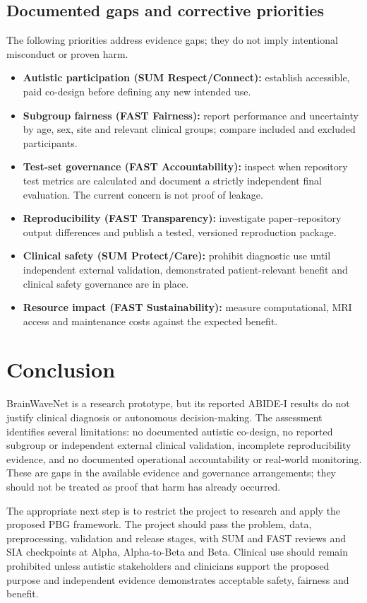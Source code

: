 \documentclass[11pt,a4paper]{article}
\begin{document}
\subsection{Documented gaps and corrective priorities}
The following priorities address evidence gaps; they do not imply intentional misconduct or proven harm.

\begin{itemize}
\item \textbf{Autistic participation (SUM Respect/Connect):} establish accessible, paid co-design before defining any new intended use.
\item \textbf{Subgroup fairness (FAST Fairness):} report performance and uncertainty by age, sex, site and relevant clinical groups; compare included and excluded participants.
\item \textbf{Test-set governance (FAST Accountability):} inspect when repository test metrics are calculated and document a strictly independent final evaluation. The current concern is not proof of leakage.
\item \textbf{Reproducibility (FAST Transparency):} investigate paper--repository output differences and publish a tested, versioned reproduction package.
\item \textbf{Clinical safety (SUM Protect/Care):} prohibit diagnostic use until independent external validation, demonstrated patient-relevant benefit and clinical safety governance are in place.
\item \textbf{Resource impact (FAST Sustainability):} measure computational, MRI access and maintenance costs against the expected benefit.
\end{itemize}

\section{Conclusion}
BrainWaveNet is a research prototype, but its reported ABIDE-I results do not justify clinical diagnosis or autonomous decision-making. The assessment identifies several limitations: no documented autistic co-design, no reported subgroup or independent external clinical validation, incomplete reproducibility evidence, and no documented operational accountability or real-world monitoring. These are gaps in the available evidence and governance arrangements; they should not be treated as proof that harm has already occurred.

The appropriate next step is to restrict the project to research and apply the proposed PBG framework. The project should pass the problem, data, preprocessing, validation and release stages, with SUM and FAST reviews and SIA checkpoints at Alpha, Alpha-to-Beta and Beta. Clinical use should remain prohibited unless autistic stakeholders and clinicians support the proposed purpose and independent evidence demonstrates acceptable safety, fairness and benefit.
\end{document}
